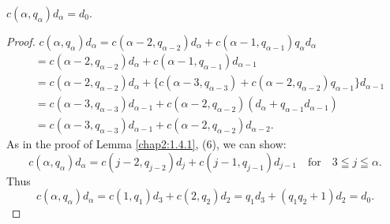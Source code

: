 \begin{lemma*}
$c(\alpha,q_{\alpha})d_{\alpha}=d_{0}$.
\end{lemma*}

\begin{proof}
$c(\alpha,q_{\alpha})d_{\alpha}=c(\alpha-2,q_{\alpha-2})d_{\alpha}+c(\alpha-1,q_{\alpha-1})q_{\alpha}d_{\alpha}$
\begin{align*}
&=
  c(\alpha-2,q_{\alpha-2})d_{\alpha}+c(\alpha-1,q_{\alpha-1})d_{\alpha-1}\\
&=
  c(\alpha-2,q_{\alpha-2})d_{\alpha}+\{c(\alpha-3,q_{\alpha-3})+c(\alpha-2,q_{\alpha-2})q_{\alpha-1}\}d_{\alpha-1}\\
&=
  c(\alpha-3,q_{\alpha-3})d_{\alpha-1}+c(\alpha-2,q_{\alpha-2})(d_{\alpha}+q_{\alpha-1}d_{\alpha-1})\\ 
&= c(\alpha-3,q_{\alpha-3})d_{\alpha-1}+c(\alpha-2,q_{\alpha-2})d_{\alpha-2}.
\end{align*}
As in the proof of Lemma \ref{chap2:1.4.1}, (6), we can show:
$$
c(\alpha,q_{\alpha})d_{\alpha}=c(j-2,q_{j-2})d_{j}+c(j-1,q_{j-1})d_{j-1}\quad\text{for}\quad
3\leqq j\leqq \alpha.
$$
Thus
$$
c(\alpha,q_{\alpha})d_{\alpha}=c(1,q_{1})d_{3}+c(2,q_{2})d_{2}=q_{1}d_{3}+(q_{1}q_{2}+1)d_{2}=d_{0}.
$$
\end{proof}

